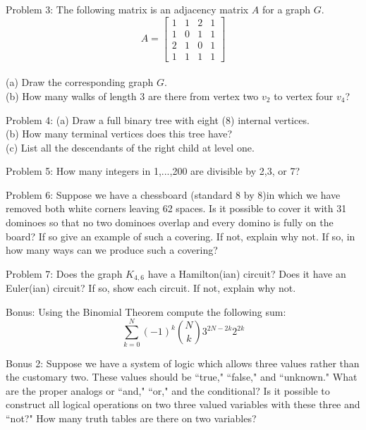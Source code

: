 \documentclass[16 pt]{amsart}
\theoremstyle{definition}
\theoremstyle{remark}
\numberwithin{equation}{subsection}
\begin{document}
\newpage

Problem 3: The following matrix is an adjacency matrix $A$ for a graph $G$.\\
\[
A = 
\begin{bmatrix}
1 & 1 & 2 & 1 \\
1 & 0 & 1 & 1 \\
2 & 1 & 0 & 1 \\
1 & 1 & 1 & 1 
\end{bmatrix}
\]
\\

(a) Draw the corresponding graph $G$.\\

(b) How many walks of length 3 are there from vertex two $v_2$ to vertex four $v_4$?


\newpage

Problem 4: (a) Draw a full binary tree with eight (8) internal vertices.\\

(b) How many terminal vertices does this tree have?\\

(c) List all the descendants of the right child at level one.


\newpage

Problem 5: How many integers in 1,...,200 are divisible by 2,3, or 7?


\newpage

Problem 6: Suppose we have a chessboard (standard 8 by 8)in which we have removed both white corners leaving 62 spaces.  Is it possible to cover it with 31 dominoes so that no two dominoes overlap and every domino is fully on the board?  If so give an example of such a covering.  If not, explain why not.  If so, in how many ways can we produce such a covering?


\newpage

Problem 7: Does the graph $K_{4,6}$ have a Hamilton(ian) circuit?  Does it have an Euler(ian) circuit? If so, show each circuit.  If not, explain why not.




\newpage

Bonus: Using the Binomial Theorem compute the following sum:
\[
\sum_{k=0}^{N}(-1)^k \binom{N}{k} 3^{2N-2k}2^{2k}
\]


\vspace{.5in}

Bonus 2: Suppose we have a system of logic which allows three values rather than the customary two.  These values should be ``true," ``false," and ``unknown."  What are the proper analogs or ``and," ``or," and the conditional?  Is it possible to construct all logical operations on two three valued variables with these three and ``not?"  How many truth tables are there on two variables?
\end{document}
